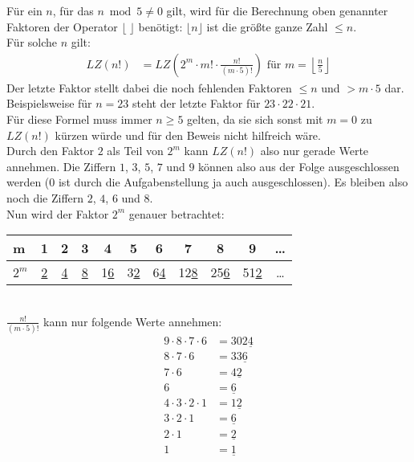 \documentclass[12pt,a4paper,oneside]{article}
\begin{document}
Für ein $n$, für das $n\bmod 5 \neq 0$ gilt, wird für die Berechnung oben genannter Faktoren der Operator $\lfloor\;\rfloor$ benötigt: $\lfloor n \rfloor$ ist die größte ganze Zahl $\leq n$. \\[10pt]
Für solche $n$ gilt:
\begin{equation*}
	\begin{split}
		LZ(n!) &= LZ\left(2^m \cdot m! \cdot \frac{n!}{(m\cdot5)!} \right) \text{ für } m = \left\lfloor\frac{n}{5}\right\rfloor
	\end{split}
\end{equation*}
Der letzte Faktor stellt dabei die noch fehlenden Faktoren $\leq n$ und $> m\cdot5$ dar. Beispielsweise für $n=23$ steht der letzte Faktor für $23\cdot22\cdot21$. \\[10pt]
Für diese Formel muss immer $n\geq5$ gelten, da sie sich sonst mit $m=0$ zu $LZ(n!)$ kürzen würde und für den Beweis nicht hilfreich wäre. \\[10pt]
Durch den Faktor $2$ als Teil von $2^m$ kann $LZ(n!)$ also nur gerade Werte annehmen. Die Ziffern $1$, $3$, $5$, $7$ und $9$ können also aus der Folge ausgeschlossen werden ($0$ ist durch die Aufgabenstellung ja auch ausgeschlossen). Es bleiben also noch die Ziffern $2$, $4$, $6$ und $8$. \\[10pt]
Nun wird der Faktor $2^m$ genauer betrachtet:
\begin{table}[h!]
	\hspace{0.5cm}\begin{tabular}{l|c|c|c|c|c|c|c|c|c|c}
		m & 1 & 2 & 3 & 4 & 5 & 6 & 7 & 8 & 9 & \dots \\
		\hline
		$2^m$ & \underline{2} & \underline{4} & \underline{8} & 1\underline{6} & 3\underline{2} & 6\underline{4} & 12\underline{8} & 25\underline{6} & 51\underline{2} & \dots \\
	\end{tabular}
\end{table}
\\
$\frac{n!}{(m\cdot5)!}$ kann nur folgende Werte annehmen:
\begin{equation*}
	\begin{split}
		9\cdot8\cdot7\cdot6 &= 302\underline{4} \\
		8\cdot7\cdot6 &= 33\underline{6} \\
		7\cdot6 &= 4\underline{2} \\
		6 &= \underline{6} \\
		4\cdot3\cdot2\cdot1 &= 1\underline{2} \\
		3\cdot2\cdot1 &= \underline{6} \\
		2\cdot1 &= \underline{2} \\
		1 &= \underline{1}
	\end{split}
\end{equation*}
\end{document}
